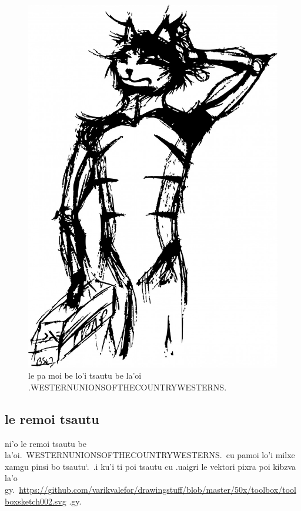 \documentclass{report}
\newcommand\sds{\spacefactor\sfcode`.\ \space}
\begin{document}
\begin{figure}[ht]
	\centering
	\includegraphics[keepaspectratio, width=\textwidth, height=0.75\textheight]{50x/toolbox/s1v1.jpg}
	\caption[center]{le pa moi be lo'i tsautu be la'oi .WESTERNUNIONSOFTHECOUNTRYWESTERNS.}
\end{figure}
\subsection{le remoi tsautu}
ni'o le remoi tsautu be la'oi.\ WESTERNUNIONSOFTHECOUNTRYWESTERNS.\ cu pamoi lo'i milxe xamgu pinsi bo tsautu\sds  .i ku'i ti poi tsautu cu .uaigri le vektori pixra poi kibzva la'o gy.\ \url{https://github.com/varikvalefor/drawingstuff/blob/master/50x/toolbox/toolboxsketch002.svg} .gy.
\end{document}
